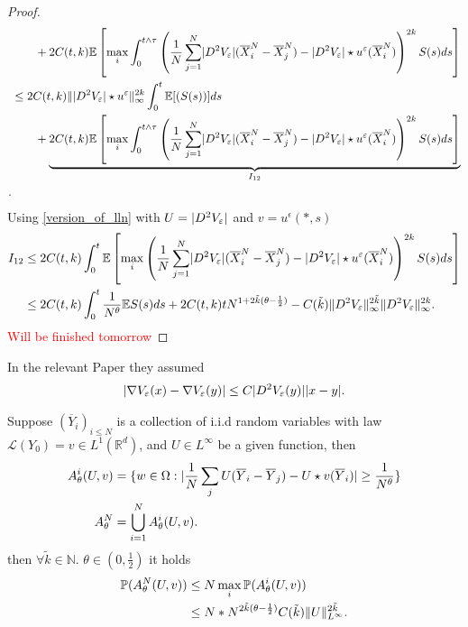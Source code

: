\begin{proof}
\begin{align*}
        &\qquad + 2 C(t,k) \E\left[\max_{i} \int_0^{t \land \tau } \left( \frac{1}{N} \sum_{j=1}^{N} \abs{D^2 V_\epsilon}(\overline{X}_i^{N} - \overline{X}_{j}^{N}   ) - \abs{D^{2}V_\epsilon } \star  u^{\epsilon}(\overline{X}_i^{N}  )  \right)^{2k} S(s) ds \right] \\
        &\le  2 C(t,k) \|\abs{D^2 V_\epsilon} \star  u ^{\epsilon} \|_{\infty}^{2k}  \int_0^{t} \E[(S(s))]  ds \\
        &\qquad + \underbrace{2 C(t,k) \E\left[\max_{i} \int_0^{t \land \tau } \left( \frac{1}{N} \sum_{j=1}^{N} \abs{D^2 V_\epsilon}(\overline{X}_i^{N} - \overline{X}_{j}^{N}   ) - \abs{D^{2}V_\epsilon } \star  u^{\epsilon}(\overline{X}_i^{N}  )  \right)^{2k} S(s) ds \right]}_{I_{12}} \\
.\end{align*}
Using \autoref{version_of_lln} with $U = \abs{D^2V_{\epsilon}}$ and $v = u^{\epsilon}(*,s) $
\begin{align*}
  I_{12} &\le  2 C(t,k) \int_0^{t}  \E\left[\max_{i} \left( \frac{1}{N} \sum_{j=1}^{N} \abs{D^2 V_\epsilon}(\overline{X}_i^{N} - \overline{X}_{j}^{N}   ) - \abs{D^{2}V_\epsilon } \star  u^{\epsilon}(\overline{X}_i^{N}  )  \right)^{2k} S(s) ds \right]\\
         &\le  2 C(t,k) \int_0^{t} \frac{1}{N^{\theta } }  \E{S(s)} ds  + 2 C(t,k)t N^{1+2 \tilde{k}(\theta  - \frac{1}{2}) } - C(\tilde{k} )  \|D^2V_{\epsilon}\|_{\infty}^{2 \tilde{k} } \|D^2 V_{\epsilon}\|^{2k}_{\infty} 
.\end{align*}
\textcolor{Red}{Will be finished tomorrow}
\end{proof}
\begin{remark}
 In the relevant Paper   they assumed 
 \begin{align*}
   \abs{\nabla V_{\epsilon}(x) - \nabla V_{\epsilon}(y)} \le  C \abs{D^{2} V_{\epsilon}(y) }\abs{x-y}
 .\end{align*}
\end{remark}
\begin{lemma}[A version of l.l.n]\label{version_of_lln}
  Suppose $(\overline{Y}_i )_{i \le N}$ is a collection of i.i.d random variables with law $\mathcal{L}(Y_0) = v \in  L^{1}(\mathbb{R}^{d} ) $,
  and $U \in  L^{\infty} $ be a given function, then 
  \begin{align*}
    A_{\theta }^{i} (U,v) &= \{w \in  \Omega  : \abs{\frac{1}{N} \sum_{j} U(\overline{Y}_i - \overline{Y}_j  )- U \star  v (\overline{Y}_i )} \ge \frac{1}{N^{\theta} }\}  \\
    A_{\theta }^{N} &= \bigcup_{i=1}^{N}   A_{\theta }^{i} (U,v)
  .\end{align*}
  then $\forall  \tilde{k} \in  \mathbb{N} $. $\theta \in  (0,\frac{1}{2})$ it holds 
  \begin{align*}
    \P(A_{\theta }^{N}(U,v) ) &\le N \max_{i} \P(A_{\theta }^{i}(U,v) )\\
                              &\le N * N^{2 \tilde{k}(\theta  - \frac{1}{2}) }  C(\tilde{k} ) \|U\|_{L^{\infty} }^{2 \tilde{k} } 
  .\end{align*}
\end{lemma}

